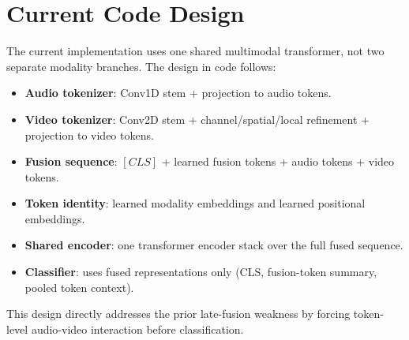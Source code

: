 \documentclass[11pt]{article}
\begin{document}
\section{Current Code Design}
The current implementation uses one shared multimodal transformer, not two separate modality branches. The design in code follows:
\begin{itemize}
  \item \textbf{Audio tokenizer}: Conv1D stem + projection to audio tokens.
  \item \textbf{Video tokenizer}: Conv2D stem + channel/spatial/local refinement + projection to video tokens.
  \item \textbf{Fusion sequence}: \([CLS]\) + learned fusion tokens + audio tokens + video tokens.
  \item \textbf{Token identity}: learned modality embeddings and learned positional embeddings.
  \item \textbf{Shared encoder}: one transformer encoder stack over the full fused sequence.
  \item \textbf{Classifier}: uses fused representations only (CLS, fusion-token summary, pooled token context).
\end{itemize}

This design directly addresses the prior late-fusion weakness by forcing token-level audio-video interaction before classification.
\end{document}
